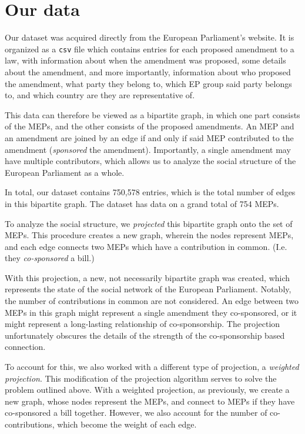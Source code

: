 \documentclass[lettersize,journal]{IEEEtran}
\begin{document}
\section{Our data} \label{sec:data}

Our dataset was acquired directly from the European Parliament's website. It is organized as a \texttt{csv} file which contains entries for each proposed amendment to a law, with information about when the amendment was proposed, some details about the amendment, and more importantly, information about who proposed the amendment, what party they belong to, which EP group said party belongs to, and which country are they are representative of.


This data can therefore be viewed as a bipartite graph, in which one part consists of the MEPs, and the other consists of the proposed amendments. An MEP and an amendment are joined by an edge if and only if said MEP contributed to the amendment (\textit{sponsored} the amendment). Importantly, a single amendment may have multiple contributors, which allows us to analyze the social structure of the European Parliament as a whole.

In total, our dataset contains 750,578 entries, which is the total number of edges in this bipartite graph. The dataset has data on a grand total of 754 MEPs. %

To analyze the social structure, we \textit{projected} this bipartite graph onto the set of MEPs. This procedure creates a new graph, wherein the nodes represent MEPs, and each edge connects two MEPs which have a contribution in common. (I.e. they \textit{co-sponsored} a bill.)

With this projection, a new, not necessarily bipartite graph was created, which represents the state of the social network of the European Parliament. Notably, the number of contributions in common are not considered. An edge between two MEPs in this graph might represent a single amendment they co-sponsored, or it might represent a long-lasting relationship of co-sponsorship. The projection unfortunately obscures the details of the strength of the co-sponsorship based connection.

To account for this, we also worked with a different type of projection, a \textit{weighted projection}. This modification of the projection algorithm serves to solve the problem outlined above. With a weighted projection, as previously, we create a new graph, whose nodes represent the MEPs, and connect to MEPs if they have co-sponsored a bill together. However, we also account for the number of co-contributions, which become the weight of each edge.
\end{document}
